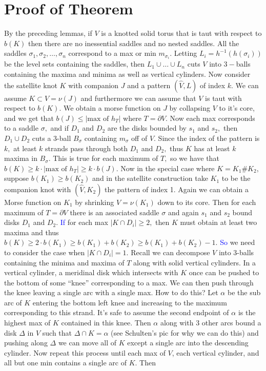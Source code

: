 \documentclass[11pt, oneside]{article}
\begin{document}
\section*{Proof of Theorem}
By the preceding lemmas, if $V$ is a knotted solid torus that is taut with respect to $b(K)$ then there are no inessential saddles and no nested saddles. All the saddles $\sigma_{1}, \sigma_{2}, \hdots, \sigma_{n}$ correspond to a max or min $m_{\sigma_{i}}$. Letting $L_{i} = h^{-1}(h(\sigma_{i}))$ be the level sets containing the saddles, then $L_{1} \cup \hdots \cup L_{n}$ cuts $V$ into $3-$balls containing the maxima and minima as well as vertical cylinders. \newline \newline Now consider the satellite knot $K$ with companion $J$ and a pattern $(\hat{V}, L)$ of index $k.$ We can assume $K \subset V = \nu(J)$ and furthermore we can assume that $V$ is taut with respect to $b(K).$ We obtain a morse function on $J$ by collapsing $V$ to it's core, and we get that $b(J) \leq |\text{max of }h_{T}|$ where $T = \partial V.$ Now each max corresponds to a saddle $\sigma,$ and if $D_{1}$ and $D_{2}$ are the disks bounded by $s_{1}$ and $s_{2},$ then $D_{1} \cup D_{2}$ cuts a $3$-ball $B_{\sigma}$ containing $m_{\sigma}$ off of $V.$ Since the index of the pattern is $k,$ at least $k$ strands pass through both $D_{1}$ and $D_{2},$ thus $K$ has at least $k$ maxima in $B_{\sigma}.$ This is true for each maximum of $T,$ so we have that $b(K) \geq k\cdot |\text{max of }h_{T}| \geq k\cdot b(J).$ \newline \newline Now in the special case where $K = K_{1} \# K_{2},$ suppose $b(K_{1}) \geq b(K_{2})$ and in the satellite construction take $K_{1}$ to be the companion knot with $(\hat{V}, K_{2})$ the pattern of index 1. Again we can obtain a Morse function on $K_{1}$ by shrinking $V = \nu(K_{1})$ down to its core. Then for each maximum of $T = \partial V$ there is an associated saddle $\sigma$ and again $s_{1}$ and $s_{2}$ bound disks $D_{1}$ and $D_{2}.$ \textcolor{blue}{If} for each max $|K \cap D_{i}| \geq 2,$ then $K$ must obtain at least two maxima and thus $b(K) \geq 2\cdot b(K_{1}) \geq b(K_{1}) + b(K_{2}) \geq b(K_{1}) + b(K_{2}) - 1.$ \textcolor{blue}{So} we need to consider the case when $|K \cap D_{i}| = 1.$ Recall we can decompose $V$ into $3$-balls containing the minima and maxima of $T$ along with solid vertical cylinders. In a vertical cylinder, a meridinal disk which intersects with $K$ once can be pushed to the bottom of some ``knee'' corresponding to a max. We can then push through the knee leaving a single arc with a single max. How to do this? Let $\alpha$ be the sub arc of $K$ entering the bottom left knee and increasing to the maximum corresponding to this strand. It's safe to assume the second endpoint of $\alpha$ is the highest max of $K$ contained in this knee. Then $\alpha$ along with 3 other arcs bound a disk $\Delta$ in $V$ such that $\Delta \cap K = \alpha$ (see Schulten's pic for why we can do this) and pushing along $\Delta$ we can move all of $K$ except a single arc into the descending cylinder. Now repeat this process until each max of $V$, each vertical cylinder, and all but one min contains a single arc of $K.$ Then 
\end{document}

